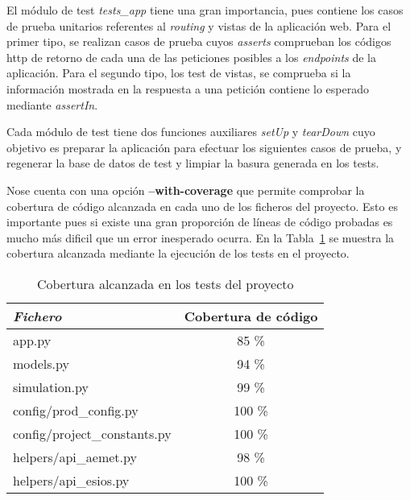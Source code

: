 El módulo de test \textit{tests\_app} tiene una gran importancia, pues contiene los casos de prueba unitarios referentes al \textit{routing} y vistas de la aplicación web. Para el primer tipo, se realizan casos de prueba cuyos \textit{asserts} comprueban los códigos http de retorno de cada una de las peticiones posibles a los \textit{endpoints} de la aplicación. Para el segundo tipo, los test de vistas, se comprueba si la información mostrada en la respuesta a una petición contiene lo esperado mediante \textit{assertIn}.

Cada módulo de test tiene dos funciones auxiliares \textit{setUp} y \textit{tearDown} cuyo objetivo es preparar la aplicación para efectuar los siguientes casos de prueba, y regenerar la base de datos de test y limpiar la basura generada en los tests.

Nose cuenta con una opción \textbf{--with-coverage} que permite comprobar la cobertura de código alcanzada en cada uno de los ficheros del proyecto. Esto es importante pues si existe una gran proporción de líneas de código probadas es mucho más dificil que un error inesperado ocurra. En la Tabla~\ref{tab:testcover} se muestra la cobertura alcanzada mediante la ejecución de los tests en el proyecto.
\begin{table}[hp]
        \centering
        \begin{tabular}{|l|c|}
                \hline
                \textbf{\textit{Fichero}} & \textbf{Cobertura de código} \\ \hline
                app.py & 85 \% \\ \hline
                models.py & 94 \% \\ \hline
                simulation.py & 99 \% \\ \hline
                config/prod\_config.py & 100 \% \\ \hline
                config/project\_constants.py & 100 \% \\ \hline
                helpers/api\_aemet.py & 98 \% \\ \hline
                helpers/api\_esios.py & 100 \% \\ \hline
             \end{tabular}
        \caption{Cobertura alcanzada en los tests del proyecto}
        \label{tab:testcover}
\end{table}

